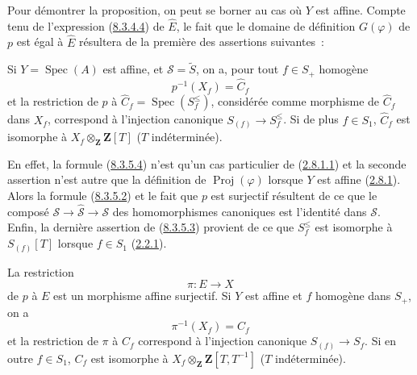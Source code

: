 Pour démontrer la proposition, on peut se borner au cas où $Y$ est affine.
Compte tenu de l'expression (\hyperref[II.8.3.4.4-fr]{8.3.4.4}) de
$\widehat{E}$, le fait que le domaine de définition $G(\varphi)$ de $p$ est
égal à $\widehat{E}$ résultera de la première des assertions suivantes~:

\begin{env}[8.3.5.3]
\label{II.8.3.5.3-fr}
Si $Y=\operatorname{Spec}(A)$ est affine, et $\mathcal{S}=\widetilde{S}$, on
a, pour tout $f\in S_+$ homogène
\begin{equation}
\label{II.8.3.5.4-fr}
  p^{-1}(X_f)=\widehat{C}_f
\tag{8.3.5.4}
\end{equation}
et la restriction de $p$ à
$\widehat{C}_f=\operatorname{Spec}(S_f^{\leq})$, considérée comme morphisme de
$\widehat{C}_f$ dans $X_f$, correspond à l'injection canonique
$S_{(f)}\to S_f^{\leq}$. Si de plus $f\in S_1$, $\widehat{C}_f$ est isomorphe
à $X_f\otimes_{\mathbf{Z}}\mathbf{Z}[T]$ ($T$ indéterminée).
\end{env}

En effet, la formule (\hyperref[II.8.3.5.4-fr]{8.3.5.4}) n'est qu'un cas
particulier de (\hyperref[II.2.8.1.1-fr]{2.8.1.1}) et la seconde assertion
n'est autre que la définition de $\operatorname{Proj}(\varphi)$ lorsque $Y$
est affine (\hyperref[II.2.8.1-fr]{2.8.1}). Alors la formule
(\hyperref[II.8.3.5.2-fr]{8.3.5.2}) et le fait que $p$ est surjectif résultent
de ce que le composé $\mathcal{S}\to\widehat{\mathcal{S}}\to\mathcal{S}$ des
homomorphismes canoniques est l'identité dans $\mathcal{S}$. Enfin, la
dernière assertion de (\hyperref[II.8.3.5.3-fr]{8.3.5.3}) provient de ce que
$S_f^{\leq}$ est isomorphe à $S_{(f)}[T]$ lorsque $f\in S_1$
(\hyperref[II.2.2.1-fr]{2.2.1}).

\begin{corollary}[8.3.6]
\label{II.8.3.6-fr}
La restriction
\begin{equation}
\label{II.8.3.6.1-fr}
  \pi:E\to X
\tag{8.3.6.1}
\end{equation}
de $p$ à $E$ est un morphisme affine surjectif. Si $Y$ est affine et $f$
homogène dans $S_+$, on a
\begin{equation}
\label{II.8.3.6.2-fr}
  \pi^{-1}(X_f)=C_f
\tag{8.3.6.2}
\end{equation}
et la restriction de $\pi$ à $C_f$ correspond à l'injection canonique
$S_{(f)}\to S_f$. Si en outre $f\in S_1$, $C_f$ est isomorphe à
$X_f\otimes_{\mathbf{Z}}\mathbf{Z}[T,T^{-1}]$ ($T$ indéterminée).
\end{corollary}

